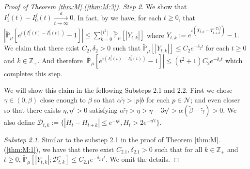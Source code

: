 \documentclass[12pt,a4paper]{amsart}
\theoremstyle{plain}
\theoremstyle{definition}
\numberwithin{equation}{section}
\begin{document}
\begin{proof}[Proof of Theorem \ref{thm:M}.(\ref{thm:M:3})]
  \emph{Step 2.} We show that $I^f_1(t) - I^f_0(t) \xrightarrow[t\to \infty]{d} 0$.
  In fact, by \cite[Lemma 3.4.3]{Durrett2010Probability} we have, for each $t\geq 0$, that $|\widetilde {\mathbb P}_{\mu}[e^{i(I_{1}^{f}(t) - I_0^f(t))} - 1]| \leq \sum_{k=0}^{\lfloor t^2 \rfloor} \widetilde {\mathbb {P}}_\mu[|Y_{t,k}|]$ where $Y_{t,k} := e^{i(\widetilde {\Upsilon}_{t,k} - \Upsilon_{t+k}^{-T_{k}\widetilde {f}})} - 1. $
  We claim that there exist $C_2, \delta_2>0$ such that $\widetilde {\mathbb {P}}_\mu[|Y_{t,k}|] \leq C_2e^{-\delta_2 t}$ for each $t\geq 0$ and $k \in \mathbb Z_+$.
  And therefore $|\widetilde {\mathbb P}_{\mu}[e^{i(I_{1}^{f}(t) - I_0^f(t))} - 1]| \leq (t^2+1)C_2e^{-\delta_2 t}$ which completes this step.

  We will show this claim in the following Substeps 2.1 and 2.2.
  First we chose $\gamma\in(0, \beta)$ close enough to $\beta$ so that $\alpha \tilde \gamma > |p|b$ for each $p\in \mathcal N$; 
  and even closer so that there exists $\eta,\eta'>0$ satisfying $\alpha \tilde \gamma > \eta>\eta - 3\eta'> \alpha (\tilde \beta - \tilde \gamma)>0$. We also define $\mathcal{D}_{t,k} :=\{|H_t-H_{t+k}|\leq  e^{-\eta t}, H_{t}> 2e^{-\eta' t}\}$.

  \emph{Substep 2.1.} Similar to the substep 2.1 in the proof of Theorem \ref{thm:M}.(\ref{thm:M:1}), we have that there exist $C_{2.1},\delta_{2.1} >0$ such that for all $k \in \mathbb Z_+$ and $t\geq 0$, $ \mathbb{\widetilde{P}}_{\mu}[|Y_{t,k}|;\mathcal{D}^c_{t,k}] \leq C_{2.1} e^{-\delta_{2.1} t}$.
  We omit the details.


\end{proof}
\end{document}
